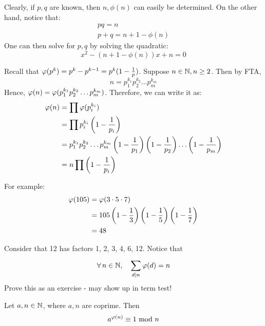 \documentclass{article}
\begin{document}
\begin{pf}[source=Primary Source Material]
    Clearly, if $ p, q $ are known, then $ n, \phi(n) $ can easily be determined. \vsp
    On the other hand, notice that:
    \begin{gather*}
        pq = n \\
        p + q = n + 1 - \phi(n)
    \end{gather*}
    One can then solve for $ p, q $ by solving the quadratic:
    \begin{equation*}
        x^{2} - (n + 1 - \phi(n))x + n = 0
    \end{equation*}
\end{pf}

Recall that $ \operatorname{\varphi}(p^{k}) = p^{k} - p^{k-1} = p^{k}(1 - \frac{1}{p}) $.
Suppose $ n \in \mathbb{N}, n \geq 2 $.
Then by FTA,
\begin{equation*}
    n = p_{1}^{k_{1}}p_{2}^{k_{2}}\dots p_{m}^{k_{m}}
\end{equation*}
Hence, $ \operatorname{\varphi}(n) = \operatorname{\varphi}(p_{1}^{k_{1}}p_{2}^{k_{2}}\dots p_{m}^{k_{m}}) $.
Therefore, we can write it as:
\begin{align*}
    \operatorname{\varphi}(n) & = \prod \operatorname{\varphi}(p_{i}^{k_{i}}) \\
             & = \prod p_{i}^{k_{i}} \left( 1 - \frac{1}{p_{i}} \right) \\
             & = p_{1}^{k_{1}}p_{2}^{k_{2}}\dots p_{m}^{k_{m}} \left( 1 - \frac{1}{p_{1}} \right) \left( 1 - \frac{1}{p_{2}} \right) \dots \left( 1 - \frac{1}{p_{m}} \right) \\
             & = n \prod \left( 1 - \frac{1}{p_{i}} \right)
\end{align*}

For example:
\begin{align*}
    \operatorname{\varphi}(105) & = \operatorname{\varphi}(3 \cdot 5 \cdot 7) \\
               & = 105 \left( 1 - \frac{1}{3} \right) \left( 1 - \frac{1}{5} \right)\left( 1 - \frac{1}{7} \right) \\
               & = 48
\end{align*}

Consider that 12 has factors 1, 2, 3, 4, 6, 12.
Notice that
\begin{equation*}
    \forall \, n \in \mathbb{N}, \quad \sum_{d \mid n}^{} {\operatorname{\varphi}(d)} = n
\end{equation*}
Prove this as an exercise - may show up in term test!

\begin{thm}[title=Euler's Theorem]
    Let $ a, n \in \mathbb{N} $, where $ a, n $ are coprime.
    Then
    \begin{equation*}
        a^{\operatorname{\varphi}(n)} \equiv 1 \ \mathrm{mod}\ n
    \end{equation*}
\end{thm}
\end{document}
